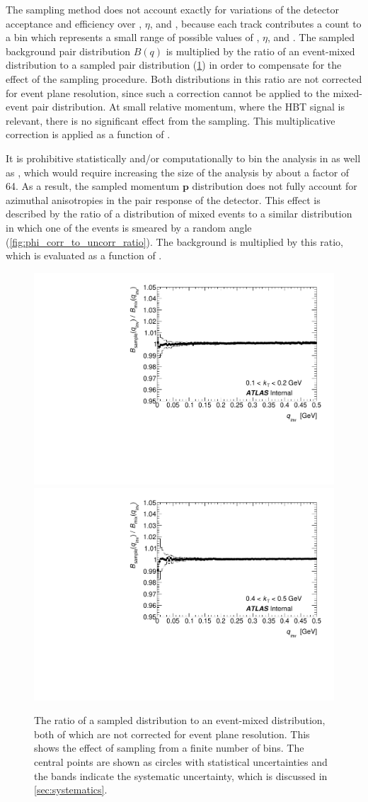 The sampling method does not account exactly for variations of the detector acceptance and efficiency over \pt, $\eta$, and \kphi, because each track contributes a count to a bin which represents a small range of possible values of \pt, $\eta$, and \tdpk.
The sampled background pair distribution $B(q)$ is multiplied by the ratio of an event-mixed distribution to a sampled pair distribution (\cref{fig:sample_to_mix_ratio}) in order to compensate for the effect of the sampling procedure.
Both distributions in this ratio are not corrected for event plane resolution, since such a correction cannot be applied to the mixed-event pair distribution.
At small relative momentum, where the HBT signal is relevant, there is no significant effect from the sampling.
This multiplicative correction is applied as a function of \kt.

It is prohibitive statistically and/or computationally to bin the analysis in \psit as well as \tdpk, which would require increasing the size of the analysis by about a factor of 64.
As a result, the sampled momentum $\mathbf{p}$ distribution does not fully account for azimuthal anisotropies in the pair response of the detector.
This effect is described by the ratio of a distribution of mixed events to a similar distribution in which one of the events is smeared by a random angle (\cref{fig:phi_corr_to_uncorr_ratio}).
The background is multiplied by this ratio, which is evaluated as a function of \kt.

\begin{figure}[t]
\centering
\includegraphics[width=.49\linewidth]{sample_to_mix_ratio_kt0.pdf}
\includegraphics[width=.49\linewidth]{sample_to_mix_ratio_kt3.pdf}\\
\caption{The ratio of a sampled distribution to an event-mixed distribution, both of which are not corrected for event plane resolution. This shows the effect of sampling from a finite number of bins. The central points are shown as circles with statistical uncertainties and the bands indicate the systematic uncertainty, which is discussed in \cref{sec:systematics}.}
\label{fig:sample_to_mix_ratio}
\end{figure}

